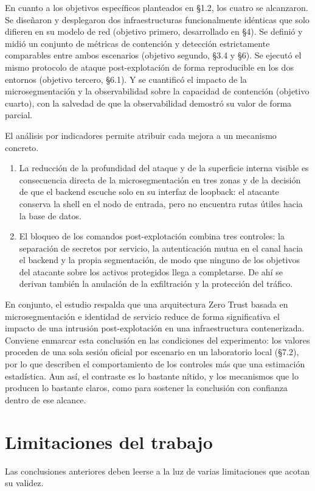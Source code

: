 \documentclass[11pt,spanish,listoffigures,listoftables]{tfgetsinf}
\begin{document}
        En cuanto a los objetivos específicos planteados en §1.2, los cuatro se alcanzaron. Se diseñaron y desplegaron dos infraestructuras funcionalmente idénticas que solo difieren en su modelo de red (objetivo primero, desarrollado en §4). Se definió y midió un conjunto de métricas de contención y detección estrictamente comparables entre ambos escenarios (objetivo segundo, §3.4 y §6). Se ejecutó el mismo protocolo de ataque post-explotación de forma reproducible en los dos entornos (objetivo tercero, §6.1). Y se cuantificó el impacto de la microsegmentación y la observabilidad sobre la capacidad de contención (objetivo cuarto), con la salvedad de que la observabilidad demostró su valor de forma parcial.

        El análisis por indicadores permite atribuir cada mejora a un mecanismo concreto. 
        \begin{enumerate}
            \item La reducción de la profundidad del ataque y de la superficie interna visible es consecuencia directa de la microsegmentación en tres zonas y de la decisión de que el backend escuche solo en su interfaz de loopback: el atacante conserva la shell en el nodo de entrada, pero no encuentra rutas útiles hacia la base de datos. 
            \item El bloqueo de los comandos post-explotación combina tres controles: la separación de secretos por servicio, la autenticación mutua en el canal hacia el backend y la propia segmentación, de modo que ninguno de los objetivos del atacante sobre los activos protegidos llega a completarse. De ahí se derivan también la anulación de la exfiltración y la protección del tráfico.
        \end{enumerate}
        En conjunto, el estudio respalda que una arquitectura Zero Trust basada en microsegmentación e identidad de servicio reduce de forma significativa el impacto de una intrusión post-explotación en una infraestructura contenerizada. Conviene enmarcar esta conclusión en las condiciones del experimento: los valores proceden de una sola sesión oficial por escenario en un laboratorio local (§7.2), por lo que describen el comportamiento de los controles más que una estimación estadística. Aun así, el contraste es lo bastante nítido, y los mecanismos que lo producen lo bastante claros, como para sostener la conclusión con confianza dentro de ese alcance.

        \section{Limitaciones del trabajo}
        Las conclusiones anteriores deben leerse a la luz de varias limitaciones que acotan su validez.
\end{document}
